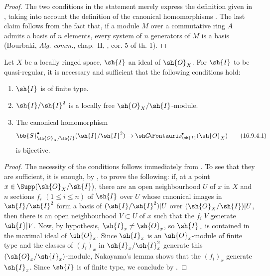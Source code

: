 
\begin{proof}
The two conditions in the statement merely express the definition given in , taking into account the definition of the canonical homomorphisms .
The last claim follows from the fact that, if a module $M$ over a commutative ring $A$ admits a basis of $n$ elements, every system of $n$ generators of $M$ is a basis (Bourbaki, \emph{Alg. comm.}, chap.~II, , cor. 5 of th. 1).
\end{proof}

\begin{corollary}[16.9.4]
\label{IV.16.9.4}
Let $X$ be a locally ringed space, $\sh{I}$ an ideal of $\sh{O}_X$.
For $\sh{I}$ to be quasi-regular, it is necessary and sufficient that the following conditions hold:
\begin{enumerate}
  \item[\rm{(i)}] $\sh{I}$ is of finite type.
  \item[\rm{(ii)}] $\sh{I}/\sh{I}^2$ is a locally free $\sh{O}_X/\sh{I}$-module.
  \item[\rm{(iii)}] The canonical homomorphism
  \[
    \label{IV.16.9.4.1}
    \bb{S}_{\sh{O}_X/\sh{I}}^\bullet (\sh{I}/\sh{I}^2) \to \shGr_{\sh{I}}^\bullet(\sh{O}_X) 
    \tag{16.9.4.1}
  \]
  is bijective.
\end{enumerate}
\end{corollary}

\begin{proof}
The necessity of the conditions follows immediately from .
To see that they are sufficient, it is enough, by , to prove the following: if, at a point $x \in \Supp(\sh{O}_X/\sh{I})$, there are an open neighbourhood $U$ of $x$ in $X$ and $n$ sections $f_i$ $(1 \leq i \leq n)$ of $\sh{I}$ over $U$ whose canonical images in $\sh{I}/\sh{I}^2$ form a basis of $(\sh{I}/\sh{I}^2)|U$ over $(\sh{O}_X/\sh{I})|U$, then there is an open neighbourhood $V \subset U$ of $x$ such that the $f_i|V$ generate $\sh{I}|V$.
Now, by hypothesis, $\sh{I}_x \neq \sh{O}_x$, so $\sh{I}_x$ is contained in the maximal ideal of $\sh{O}_x$.
Since $\sh{I}_x$ is an $\sh{O}_x$-module of finite type and the classes of $(f_i)_x$ in $\sh{I}_x/\sh{I}_x^2$ generate this $(\sh{O}_x/\sh{I}_x)$-module, Nakayama's lemma shows that the $(f_i)_x$ generate $\sh{I}_x$.
Since $\sh{I}$ is of finite type, we conclude by .
\end{proof} 

